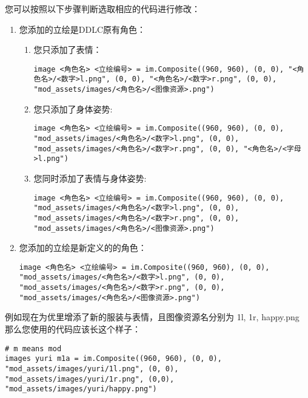 您可以按照以下步骤判断选取相应的代码进行修改：
\begin{enumerate}
    \item 您添加的立绘是DDLC原有角色：
    \begin{enumerate}
        \item 您只添加了表情：
        \begin{lstlisting}[numbers=none]
image <角色名> <立绘编号> = im.Composite((960, 960), (0, 0), "<角色名>/<数字>l.png", (0, 0), "<角色名>/<数字>r.png", (0, 0), "mod_assets/images/<角色名>/<图像资源>.png") 
        \end{lstlisting}

        \item 您只添加了身体姿势:
        \begin{lstlisting}[numbers=none]
image <角色名> <立绘编号> = im.Composite((960, 960), (0, 0), "mod_assets/images/<角色名>/<数字>l.png", (0, 0), "mod_assets/images/<角色名>/<数字>r.png", (0, 0), "<角色名>/<字母>l.png") 
        \end{lstlisting}

        \item 您同时添加了表情与身体姿势:
        \begin{lstlisting}[numbers=none]
image <角色名> <立绘编号> = im.Composite((960, 960), (0, 0), "mod_assets/images/<角色名>/<数字>l.png", (0, 0), "mod_assets/images/<角色名>/<数字>r.png", (0, 0), "mod_assets/images/<角色名>/<图像资源>.png") 
        \end{lstlisting}
    \end{enumerate}

    \item 您添加的立绘是新定义的的角色：
    \begin{lstlisting}[numbers=none]
image <角色名> <立绘编号> = im.Composite((960, 960), (0, 0), "mod_assets/images/<角色名>/<数字>l.png", (0, 0), "mod_assets/images/<角色名>/<数字>r.png", (0, 0), "mod_assets/images/<角色名>/<图像资源>.png") 
    \end{lstlisting}
\end{enumerate}

例如现在为优里增添了新的服装与表情，且图像资源名分别为 1l, 1r, happy.png
那么您使用的代码应该长这个样子：
\begin{lstlisting}
# m means mod
images yuri m1a = im.Composite((960, 960), (0, 0), "mod_assets/images/yuri/1l.png", (0, 0), "mod_assets/images/yuri/1r.png", (0,0), "mod_assets/images/yuri/happy.png")
\end{lstlisting}


